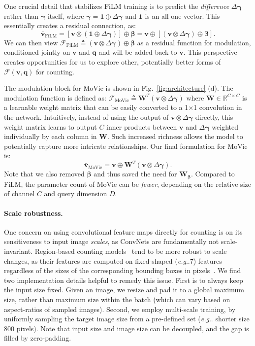 \documentclass{article} \usepackage[dvipsnames,table]{xcolor}
\makeatletter
\def\rvq{{\mathbf{q}}}
\def\rvv{{\mathbf{v}}}
\def\rmW{{\mathbf{W}}}
\def\gF{{\mathcal{F}}}
\newcommand{\ours}[0]{MoVie\xspace}
\def\x{$\times$\xspace}
\newcommand{\bgamma}{\mathbf{\gamma}}
\newcommand{\bbeta}{\mathbf{\beta}}
\DeclareRobustCommand\onedot{\futurelet\@let@token\@onedot}
\def\@onedot{\ifx\@let@token.\else.\null\fi\xspace}
\def\eg{\emph{e.g}\onedot} \def\Eg{\emph{E.g}\onedot}
\makeatother
\begin{document}
One crucial detail that stabilizes FiLM training is to predict the \emph{difference} $\Delta\bgamma$ rather than $\bgamma$ itself, where $\bgamma{=}\mathbf{1}{\oplus}\Delta\bgamma$ and $\mathbf{1}$ is an all-one vector. This essentially creates a residual connection, as:
\begin{equation}
    \bar{\rvv}_\text{FiLM} = \left[\rvv\otimes(\mathbf{1}\oplus\Delta\bgamma)\right]\oplus\bbeta = \rvv\oplus\left[(\rvv\otimes\Delta\bgamma)\oplus\bbeta\right]. \nonumber
\end{equation}
We can then view $\gF_\text{FiLM}\triangleq(\rvv{\otimes}\Delta\bgamma){\oplus}\bbeta$ as a residual function for modulation, conditioned jointly on $\rvv$ and $\rvq$ and will be added back to $\rvv$. This perspective creates opportunities for us to explore other, potentially better forms of $\gF(\rvv,\rvq)$ for counting.

The modulation block for \ours is shown in Fig.~\ref{fig:architecture} (d). The modulation function is defined as: $\gF_\text{MoVie}\triangleq{\rmW}^T(\rvv{\otimes}\Delta\bgamma)$ where $\rmW{\in}\mathbb{R}^{C{\times}C}$ is 
a learnable weight matrix that can be easily converted to a 1{\x}1 convolution in the network. Intuitively, instead of using the output of $\rvv{\otimes}\Delta\bgamma$ directly, this weight matrix learns to output $C$ inner products between $\rvv$ and $\Delta\bgamma$ weighted individually by each column in $\rmW$. Such increased richness allows the model to potentially capture more intricate relationships. Our final formulation for \ours is: 
\begin{equation}\label{eqn:movie}
    \bar{\rvv}_\text{MoVie} = \rvv\oplus{\rmW}^T(\rvv\otimes\Delta\bgamma).
\end{equation}
Note that we also removed $\bbeta$ and thus saved the need for $\rmW_{\bbeta}$. Compared to FiLM, the parameter count of \ours can be \emph{fewer}, depending on the relative size of channel $C$ and query dimension $D$. 
\paragraph{Scale robustness.} One concern on using convolutional feature maps directly for counting is on its sensitiveness to input image \emph{scales}, as ConvNets are fundamentally not scale-invariant. Region-based counting models~\cite{trott2018interpretable,zhang2018learning} tend to be more robust to scale changes, as their features are computed on fixed-shaped (\eg 7{\x}7) features regardless of the sizes of the corresponding bounding boxes in pixels~\cite{ren2015faster}. We find two implementation details helpful to remedy this issue. First is to always keep the input size fixed. Given an image, we resize and pad it to a global maximum size, rather than maximum size within the batch (which can vary based on aspect-ratios of sampled images). Second, we employ multi-scale training, by uniformly sampling the target image size from a pre-defined set (\eg shorter size 800 pixels). Note that input size and image size can be decoupled, and the gap is filled by zero-padding.
\end{document}
